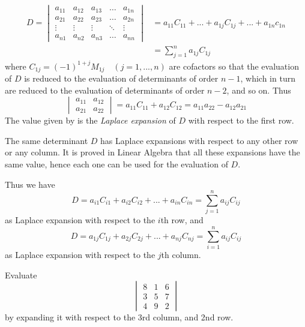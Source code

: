 \documentclass[11pt]{amsbook}
\begin{document}
\begin{equation} \label{eq:b2p1_238_firstEquation}
\begin{aligned}
D = \begin{vmatrix}
    a_{11} & a_{12} & a_{13} & \dots  & a_{1n} \\
    a_{21} & a_{22} & a_{23} & \dots  & a_{2n} \\
    \vdots & \vdots & \vdots & \ddots & \vdots \\
    a_{n1} & a_{n2} & a_{n3} & \dots  & a_{nn} 
\end{vmatrix} &= a_{11}C_{11} +  ... + a_{1j}C_{1j} + ... + a_{1n}c_{1n} \\ &= \sum_{j=1}^n  a_{1j}C_{1j}
\end{aligned}
\end{equation}
where $C_{1j} = (-1)^{1+j} M_{1j} \quad (j = 1 , ... , n)$ are cofactors so that
the evaluation of $D$ is reduced to the evaluation of determinants
of order $n - 1$, which in turn are reduced to the evaluation of
determinants of order $n - 2$, and so on. Thus
$$
\begin{vmatrix}
	a_{11} & a_{12} \\
	a_{21} & a_{22}
\end{vmatrix} = a_{11}C_{11} + a_{12}C_{12} = a_{11}a_{22} - a_{12}a_{21}
$$
The value given by  is the \textit{Laplace expansion} of $D$ with respect
to the first row.
\par The same determinant $D$ has Laplace expansions with
respect to any other row or any column. It is proved in Linear
Algebra that all these expansions have the same value, hence
each one can be used for the evaluation of $D$.
\par Thus we have
\begin{equation}
D = a_{i1}C_{i1} + a_{i2}C_{i2} + ... + a_{in}C_{in} = \sum_{j=1}^n a_{ij}C_{ij}
\end{equation}
as Laplace expansion with respect to the $i$th row, and
\begin{equation}
D = a_{1j}C_{1j} + a_{2j}C_{2j} + ... + a_{nj}C_{nj} = \sum_{i=1}^n a_{ij}C_{ij}
\end{equation}
as Laplace expansion with respect to the $j$th column.
\begin{exmp}
Evaluate
$$
\begin{vmatrix}
	8 & 1 & 6 \\
	3 & 5 & 7 \\
	4 & 9 & 2
\end{vmatrix}
$$
by expanding it with respect to the 3rd column, and 2nd row.
\end{exmp}
\end{document}
